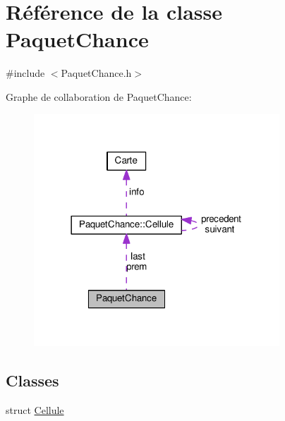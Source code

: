 \hypertarget{classPaquetChance}{}\section{Référence de la classe Paquet\+Chance}
\label{classPaquetChance}


{\ttfamily \#include $<$Paquet\+Chance.\+h$>$}



Graphe de collaboration de Paquet\+Chance\+:
\nopagebreak
\begin{figure}[H]
\begin{center}
\leavevmode
\includegraphics[width=261pt]{classPaquetChance__coll__graph}
\end{center}
\end{figure}
\subsection*{Classes}
\begin{DoxyCompactItemize}
\item 
struct \hyperlink{structPaquetChance_1_1Cellule}{Cellule}
\end{DoxyCompactItemize}
